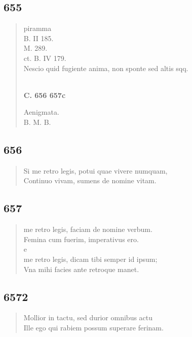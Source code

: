 \documentclass[11pt, a4paper]{report}
\begin{document}
            \subsection*{655}
      \begin{verse}
      piramma \\ B. II 185. \\ M. 289. \\ ct. B. IV 179. \\ Nescio quid fugiente anima, non sponte sed altis sqq. \\ 
        ﻿\pagebreak 
    \begin{center} \textbf{C. 656 657c} \end{center} \marginpar{[129]} Aenigmata. \\ B. M. B. \\ 
      \end{verse}
  
            \subsection*{656}
      \begin{verse}
      Si me retro legis, potui quae vivere numquam, \\ Continuo vivam, sumens de nomine vitam. \\ 
      \end{verse}
  
            \subsection*{657}
      \begin{verse}
      me retro legis, faciam de nomine verbum. \\ Femina cum fuerim, imperativus ero. \\ e \\ me retro legis, dicam tibi semper id ipsum; \\ Vna mihi facies ante retroque manet. \\ 
      \end{verse}
  
            \subsection*{6572}
      \begin{verse}
      Mollior in tactu, sed durior omnibus actu \\ Ille ego qui rabiem possum superare ferinam. \\ 
      \end{verse}
  
\end{document}
